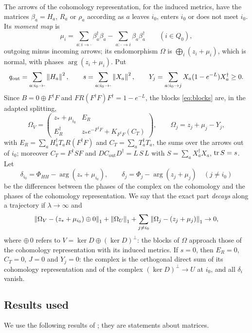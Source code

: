 The arrows of the cohomology representation, for the induced metrics, have
the matrices $\beta_a=H_a$, $R_a$ or $\rho_a$ according as $a$ leaves $i_0$,
enters $i_0$ or does not meet $i_0$. Its \emph{moment map} is
\[
 \mu_i=\sum_{a:i\to\cdot}\beta_a^\dagger\beta_a-\sum_{a:\cdot\to i}\beta_a\beta_a^\dagger
 \qquad(i\in Q_0),
\]
outgoing minus incoming arrows; its endomorphism $\Omega$ is
$\bigoplus_i(z_i+\mu_i)$, which is normal, with phases $\arg(z_i+\mu_i)$.
Put
\[
 q_{\mathrm{out}}=\sum_{a:i_0\to\cdot}\left\lVert H_a\right\rVert^2,\qquad
 s=\sum_{a:i_0\to\cdot}\left\lVert X_a\right\rVert^2,\qquad
 Y_j=\sum_{a:i_0\to j}X_a(1-e^{-L})X_a^\dagger\geq0 .
\]
Since $B=0\oplus F^\dagger F$ and $FR(F^\dagger F)F^\dagger=1-e^{-L}$, the
blocks \eqref{eq:blocks} are, in the adapted splitting,
\begin{equation}\label{eq:adaptedblocks}
 \Omega_V=\begin{pmatrix}z_\ast+\mu_{i_0}&E_R\\E_R^\dagger&z_\ast e^{-F^\dagger F}+K_{F^\dagger F}(C_T)\end{pmatrix},
 \qquad\Omega_j=z_j+\mu_j-Y_j,
\end{equation}
with $E_R=\sum_aH_a^\dagger T_aR(F^\dagger F)$ and $C_T=\sum_aT_a^\dagger T_a$,
the sums over the arrows out of $i_0$; moreover $C_T=F^\dagger SF$ and
$DC_{\mathrm{out}}D^\dagger=L\,S\,L$ with $S=\sum_aX_a^\dagger X_a$,
$\operatorname{tr} S=s$. Let
\[
 \delta_{i_0}=\Phi_{HH}-\arg(z_\ast+\mu_{i_0}),\qquad
 \delta_j=\Phi_j-\arg(z_j+\mu_j)\quad(j\neq i_0)
\]
be the differences between the phases of the complex on the cohomology and
the phases of the cohomology representation. We say that the exact part
\emph{decays} along a trajectory if $\lambda\to\infty$ and
\[
 \left\lVert\Omega_V-(z_\ast+\mu_{i_0})\oplus0\right\rVert_1+\left\lVert\Omega_U\right\rVert_1
 +\sum_{j\neq i_0}\left\lVert\Omega_j-(z_j+\mu_j)\right\rVert_1\to0,
\]
where $\oplus\,0$ refers to $V=\ker D\oplus(\ker D)^\perp$: the blocks of
$\Omega$ approach those of the cohomology representation with its induced
metrics. If $s=0$, then $E_R=0$, $C_T=0$, $J=0$ and $Y_j=0$: the complex is
the orthogonal direct sum of its cohomology representation and of the
complex $(\ker D)^\perp\to U$ at $i_0$, and all $\delta_i$ vanish.

\subsection{Results used}
We use the following results of \cite{wue26a,wue26b}; they are statements
about matrices.

